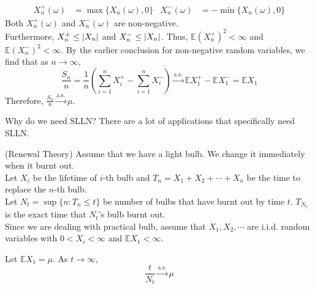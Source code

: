 \documentclass{huhtakm-template-book}
\newcommand{\expect}{\mathbb{E}}
\begin{document}
\begin{proofing}
        \begin{align*}
            X_{n}^{+}(\omega)&=\max\{X_{n}(\omega),0\} & X_{n}^{-}(\omega)&=-\min\{X_{n}(\omega),0\}
        \end{align*}
        Both $X_{n}^{+}(\omega)$ and $X_{n}^{-}(\omega)$ are non-negative.\\
        Furthermore, $X_{n}^{+}\leq\left|{X_{n}}\right|$ and $X_{n}^{-}\leq\left|{X_{n}}\right|$. Thus, $\expect(X_{n}^{+})^{2}<\infty$ and $\expect(X_{n}^{-})^{2}<\infty$. By the earlier conclusion for non-negative random variables, we find that as $n\to\infty$,
        \begin{equation*}
            \frac{S_{n}}{n}=\frac{1}{n}\left(\sum_{i=1}^{n}X_{i}^{+}-\sum_{i=1}^{n}X_{i}^{-}\right)\xrightarrow{\text{a.s.}}\expect X_{1}^{+}-\expect X_{1}^{-}=\expect X_{1}
        \end{equation*}
        Therefore, $\frac{S_{n}}{n}\xrightarrow{\text{a.s.}}\mu$.
    \end{proofing}
    \newpage
    Why do we need SLLN? There are a lot of applications that specifically need SLLN.
    \begin{eg}(Renewal Theory) Assume that we have a light bulb. We change it immediately when it burnt out.\\
    Let $X_{i}$ be the lifetime of $i$-th bulb and $T_{n}=X_{1}+X_{2}+\cdots+X_{n}$ be the time to replace the $n$-th bulb.\\
    Let $N_{t}=\sup\{n:T_{n}\leq t\}$ be number of bulbs that have burnt out by time $t$. $T_{N_{t}}$ is the exact time that $N_{t}$'s bulb burnt out.\\
    Since we are dealing with practical bulb, assume that $X_{1},X_{2},\cdots$ are i.i.d. random variables with $0<X_{i}<\infty$ and $\expect X_{1}<\infty$.
    \end{eg}
    \begin{thm}
        Let $\expect X_{1}=\mu$. As $t\to\infty$,
        \begin{equation*}
            \frac{t}{N_{t}}\xrightarrow{\text{a.s.}}\mu
        \end{equation*}
    \end{thm}
\end{document}
